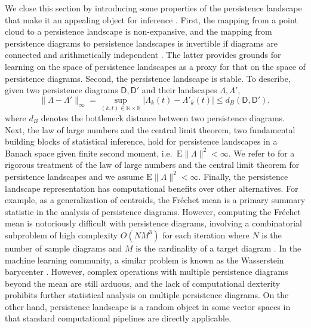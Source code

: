 \documentclass[12pt]{article}
\newcommand{\bbR}{\mathbb{R}}
\newcommand{\bbN}{\mathbb{N}}
\newcommand{\sfD}{\mathsf{D}} %
\newcommand{\Frechet}{Fr\'{e}chet }
\begin{document}
We close this section by introducing some properties of the persistence landscape that make it an appealing object for inference \citep{bubenik_statistical_2015}. First, the mapping from a point cloud to a persistence landscape is non-expansive, and the mapping from persistence diagrams to persistence landscapes is invertible if diagrams are connected and arithmetically independent  \citep{baas_persistence_2020, betthauser_graded_2021}. The latter provides grounds for learning on the space of persistence landscapes as a proxy for that on the space of persistence diagrams. Second, the persistence landscape is stable. To describe, given two persistence diagrams $\sfD, \sfD'$ and their landscapes $\Lambda, \Lambda'$, 
\begin{equation*}
\| \Lambda - \Lambda' \|_\infty = \underset{(k,t) \in \bbN \times \bbR}{\sup} |\Lambda_k (t) - \Lambda'_k (t) | \leq d_B (\sfD, \sfD'),
\end{equation*}
where $d_B$ denotes the bottleneck distance \citep{cohen-steiner_stability_2007} between two persistence diagrams. Next, the law of large numbers and the central limit theorem, two fundamental building blocks of statistical inference, hold for persistence landscapes in a Banach space given finite second moment, i.e.~$\textrm{E} \| \Lambda \|^2 < \infty$. We refer to \cite{bubenik_statistical_2015} for a rigorous treatment of the law of large numbers and the central limit theorem for persistence landscapes and we assume $\textrm{E} \| \Lambda \|^2 < \infty$. %
Finally, the persistence landscape representation has computational benefits over other alternatives. For example, as a generalization of centroids, the \Frechet mean is a primary summary statistic in the analysis of persistence diagrams. However, computing the \Frechet mean is notoriously difficult with persistence diagrams, involving a combinatorial subproblem of high complexity $O(NM^3)$ for each iteration where $N$ is the number of sample diagrams and $M$ is the cardinality of a target diagram \citep{turner_frechet_2014}. In the machine learning community, a similar problem is known as the Wasserstein barycenter \citep{agueh_barycenters_2011, villani_optimal_2009}. However, complex operations with multiple persistence diagrams beyond the mean are still arduous, and the lack of computational dexterity prohibits further statistical analysis on multiple persistence diagrams. On the other hand, persistence landscape is a random object in some vector spaces in that standard computational pipelines are directly applicable. 
\end{document}
